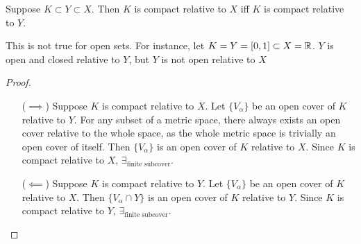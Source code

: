 \begin{thm}[33]
	Suppose $K \subset Y \subset  X$.
	Then $K$ is compact relative to $X$ iff $K$ is compact relative to $Y$.
	\begin{note}
		This is not true for open sets.
		For instance, let $K=Y=[0,1] \subset X=\mathbb{R} $.
		$Y$ is open and closed relative to $Y$, but $Y$ is not open relative to $X$
	\end{note}
	\begin{proof}\hfill
		\begin{itemize}
			\item [($\implies$)] Suppose $K$ is compact relative to $X$. Let $\{V_{\alpha}\}$ be an open cover of $K$ relative to $Y$. For any subset of a metric space, there always exists an open cover relative to the whole space, as the whole metric space is trivially an open cover of itself.
			      Then $\{V_{\alpha}\}$ is an open cover of $K$ relative to $X$. Since $K$ is compact relative to $X$, $\exists_{\text{finite subcover}}$.
			\item [($\impliedby$)] Suppose $K$ is compact relative to $Y$. Let $\{V_{\alpha}\}$ be an open cover of $K$ relative to $X$.
			      Then $\{V_{\alpha} \cap Y\}$ is an open cover of $K$ relative to $Y$. Since $K$ is compact relative to $Y$, $\exists_{\text{finite subcover}}$.
		\end{itemize}
	\end{proof}
\end{thm}
